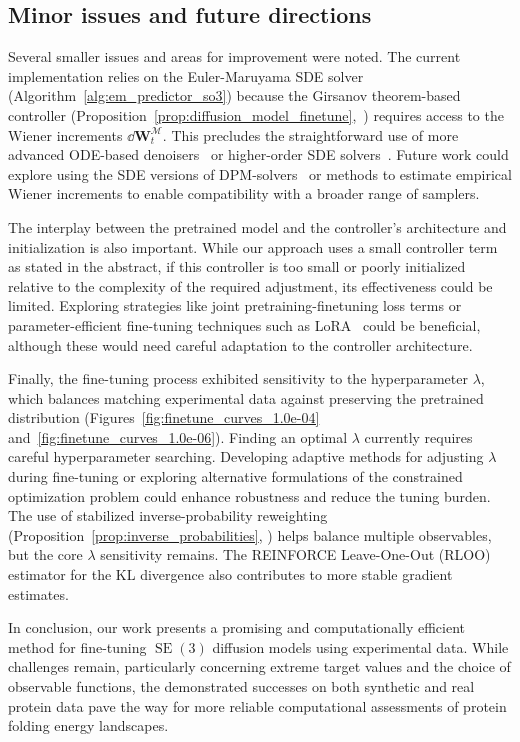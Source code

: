 \documentclass{article}
\theoremstyle{plain}
\theoremstyle{definition}
\theoremstyle{remark}
\DeclareMathOperator{\SE}{SE}
\begin{document}
\subsection{Minor issues and future directions}

Several smaller issues and areas for improvement were noted. The current implementation relies on the Euler-Maruyama SDE solver (Algorithm~\ref{alg:em_predictor_so3}) because the Girsanov theorem-based controller (Proposition~\ref{prop:diffusion_model_finetune},~\cite{girsanov_on_manifolds, girsanov_in_riemannian}) requires access to the Wiener increments $\dd \mathbf{W}_t^\mathcal{M}$. This precludes the straightforward use of more advanced ODE-based denoisers~\cite{dpmsolver} or higher-order SDE solvers~\cite{heun}. Future work could explore using the SDE versions of DPM-solvers~\cite{sdedpmsolver} or methods to estimate empirical Wiener increments to enable compatibility with a broader range of samplers.

The interplay between the pretrained model and the controller's architecture and initialization is also important. While our approach uses a small controller term as stated in the abstract, if this controller is too small or poorly initialized relative to the complexity of the required adjustment, its effectiveness could be limited. Exploring strategies like joint pretraining-finetuning loss terms or parameter-efficient fine-tuning techniques such as LoRA~\cite{lora} could be beneficial, although these would need careful adaptation to the controller architecture.

Finally, the fine-tuning process exhibited sensitivity to the hyperparameter $\lambda$, which balances matching experimental data against preserving the pretrained distribution (Figures~\ref{fig:finetune_curves_1.0e-04} and~\ref{fig:finetune_curves_1.0e-06}). Finding an optimal $\lambda$ currently requires careful hyperparameter searching. Developing adaptive methods for adjusting $\lambda$ during fine-tuning or exploring alternative formulations of the constrained optimization problem could enhance robustness and reduce the tuning burden. The use of stabilized inverse-probability reweighting (Proposition~\ref{prop:inverse_probabilities}, \cite{inverse_probability}) helps balance multiple observables, but the core $\lambda$ sensitivity remains. The REINFORCE Leave-One-Out (RLOO)~\cite{rloo} estimator for the KL divergence also contributes to more stable gradient estimates.

In conclusion, our work presents a promising and computationally efficient method for fine-tuning $\SE(3)$ diffusion models using experimental data. While challenges remain, particularly concerning extreme target values and the choice of observable functions, the demonstrated successes on both synthetic and real protein data pave the way for more reliable computational assessments of protein folding energy landscapes.
\end{document}
